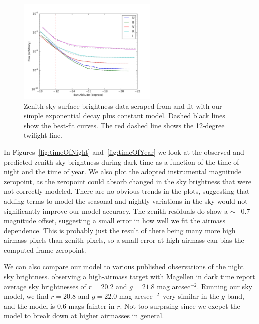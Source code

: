 \documentclass[]{spie}
\begin{document}
\begin{figure}
  \includegraphics[height=5cm]{plots/patatFits.pdf}
  \caption{Zenith sky surface brightness data scraped from \cite{Patat06} and fit with our simple exponential decay plus constant model. Dashed black lines show the best-fit curves.  The red dashed line shows the 12-degree twilight line.  \label{fig:Patat} }
\end{figure}




In Figures~\ref{fig:timeOfNight} and~\ref{fig:timeOfYear} we look at the observed and predicted zenith sky brightness during dark time as a function of the time of night and the time of year.  We also plot the adopted instrumental magnitude zeropoint, as the zeropoint could absorb changed in the sky brightness that were not correctly modeled.  There are no obvious trends in the plots, suggesting that adding terms to model the seasonal and nightly variations in the sky would not significantly improve our model accuracy.  The zenith residuals do show a $\sim-0.7$ magnitude offset, suggesting a small error in how well we fit the airmass dependence.  This is probably just the result of there being many more high airmass pixels than zenith pixels, so a small error at high airmass can bias the computed frame zeropoint.

We can also compare our model to various published observations of the night sky brightness.  \cite{Galaz15} observing a high-airmass target with Magellen in dark time report average sky brightnesses of $r=20.2$ and $g=21.8$ mag arcsec$^{-2}$.  Running our sky model, we find  $r=20.8$ and $g=22.0$ mag arcsec$^{-2}$--very similar in the $g$ band, and the model is 0.6 mags fainter in $r$.  Not too surprsing since we exepct the model to break down at higher airmasses in general.
\end{document}
